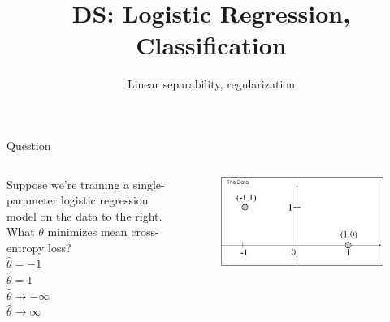 \documentclass[aspectratio=169]{../latex_main/tntbeamer}  %
\title[Introduction]{DS: Logistic Regression, Classification}
\subtitle{Linear separability, regularization}
\begin{document}
	
	\maketitle
	\begin{frame}{Question}
	    \begin{columns}
	        \begin{column}{.5\textwidth}
	              Suppose we’re training a single-parameter logistic regression model on the data to the right.\\
	              \bigskip
	              What $\theta$ minimizes mean cross-entropy loss? \\
	              \bigskip
	              $\hat{\theta} = -1$\\
	              $\hat{\theta} = 1$\\
	              $\hat{\theta} \rightarrow -\infty$\\
	              $\hat{\theta} \rightarrow \infty$\\
	        \end{column}
	        
	        
	        
	        \begin{column}{.5\textwidth}
	                \begin{figure}
	                    \centering
	                    \includegraphics[scale=.5]{Bild40}
	                \end{figure}
	        \end{column}
	    \end{columns}
	    
	\end{frame}
	
\end{document}
